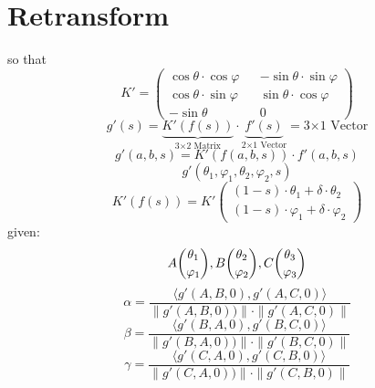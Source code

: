 \section{Retransform}
so that
\begin{equation}
    K'=
    \begin{pmatrix}
       \cos\theta\cdot\cos\varphi && -\sin\theta\cdot\sin\varphi \\
       \cos\theta\cdot\sin\varphi && \sin\theta\cdot\cos\varphi \\
       -\sin\theta && 0
    \end{pmatrix}
\end{equation}
\begin{equation}
    g'(s) = \underbrace{K'(f(s))}_{\text{3×2 Matrix}}\cdot\underbrace{f'(s)}_{\text{2×1 Vector}}=\text{3×1 Vector}
\end{equation}
\begin{equation}
    g'(a,b,s) = K'(f(a,b,s))\cdot f'(a,b,s)
\end{equation}
\begin{equation}
    g'(\theta_1,\varphi_1,\theta_2,\varphi_2,s)
\end{equation}
\begin{equation}
    K'(f(s))=K'
    \begin{pmatrix}
        (1-s)\cdot\theta_1 + \delta\cdot\theta_2 \\
        (1-s)\cdot\varphi_1 + \delta\cdot\varphi_2
    \end{pmatrix}
\end{equation}
given:
\begin{equation*}
    A\dbinom{\theta_1}{\varphi_1}, B\dbinom{\theta_2}{\varphi_2}, C\dbinom{\theta_3}{\varphi_3}
\end{equation*}
\begin{equation}
    \alpha=\frac{\langle g'(A,B,0), g'(A,C,0)\rangle}{\|g'(A,B,0))\|\cdot \|g'(A,C,0)\|}
\end{equation}
\begin{equation}
    \beta=\frac{\langle g'(B,A,0), g'(B,C,0)\rangle}{\|g'(B,A,0))\|\cdot \|g'(B,C,0)\|}
\end{equation}
\begin{equation}
    \gamma=\frac{\langle g'(C,A,0), g'(C,B,0)\rangle}{\|g'(C,A,0))\|\cdot \|g'(C,B,0)\|}
\end{equation}